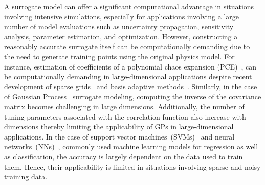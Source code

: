 A surrogate model can offer a significant computational advantage in situations involving intensive
simulations, especially for applications
involving a large number of model evaluations such as uncertainty propagation, sensitivity analysis, parameter
estimation, and optimization. However, constructing a reasonably accurate surrogate itself can be computationally demanding
due to the need to generate training points using the original physics model. 
For instance, estimation of coefficients of a polynomial chaos expansion (PCE)~\cite{Xiu:2002,Ghanem:1991},
can be computationally demanding in large-dimensional applications despite recent development 
of sparse grids~\cite{Gerstner:1998,Ganapathysubramanian:2007} and basis adaptive 
methods~\cite{Blatman:2011,Conrad:2013}. Similarly, in the case of Gaussian 
Process~\cite{Rasmussen:2004} surrogate modeling, computing the inverse of the covariance matrix
becomes challenging in large dimensions. Additionally, the number of tuning parameters associated
with the correlation function also increase with dimensions thereby limiting the applicability of
GPs in large-dimensional applications. 
In the case of support vector machines~(SVMs)~\cite{Cortes:1995} 
and neural networks~(NNs)~\cite{Haykin:1994}, commonly used machine learning models for regression as
well as classification, the accuracy is 
largely dependent on the data used to train them. Hence, their applicability is limited 
in situations involving sparse and noisy training data. 

